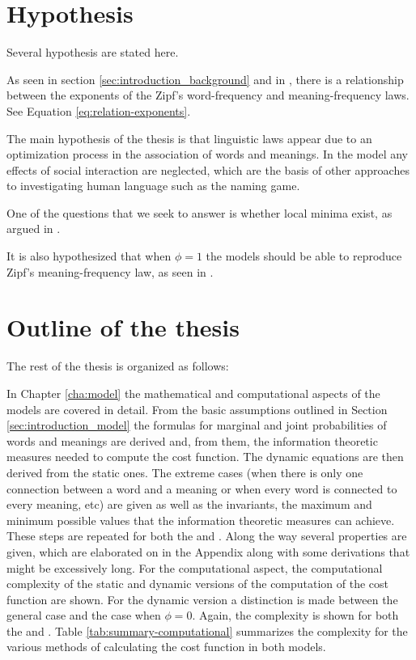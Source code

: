 \section{Hypothesis}
\label{sec:introduction_hypothesis}

Several hypothesis are stated here.

As seen in section \ref{sec:introduction_background} and in \cite{Ferrer2018a}, there is a relationship between the exponents of the Zipf's word-frequency and meaning-frequency laws.
See Equation \eqref{eq:relation-exponents}.

The main hypothesis of the thesis is that linguistic laws appear due to an optimization process in the association of words and meanings.
In the model any effects of social interaction are neglected, which are the basis of other approaches to investigating human language such as the naming game. \cite{Baronchelli2006}

One of the questions that we seek to answer is whether local minima exist, as argued in \cite{Ferrer2017a}.

It is also hypothesized that when $\phi=1$ the models should be able to reproduce Zipf's meaning-frequency law, as seen in \cite{Ferrer2018a}.

\section{Outline of the thesis}
\label{sec:introduction_outline}

The rest of the thesis is organized as follows:

In Chapter \ref{cha:model} the mathematical and computational aspects of the models are covered in detail.
From the basic assumptions outlined in Section \ref{sec:introduction_model} the formulas for marginal and joint probabilities of words and meanings are derived and, from them, the information theoretic measures needed to compute the cost function.
The dynamic equations are then derived from the static ones. The extreme cases (when there is only one connection between a word and a meaning or when every word is connected to every meaning, etc) are given as well as the invariants, the maximum and minimum possible values that the information theoretic measures can achieve.
These steps are repeated for both the \firstm{} and \secondmodel{}.
Along the way several properties are given, which are elaborated on in the Appendix along with some derivations that might be excessively long.
For the computational aspect, the computational complexity of the static and dynamic versions of the computation of the cost function are shown.
For the dynamic version a distinction is made between the general case and the case when $\phi=0$.
Again, the complexity is shown for both the \firstm{} and \secondmodel{}.
Table \ref{tab:summary-computational} summarizes the complexity for the various methods of calculating the cost function in both models.

